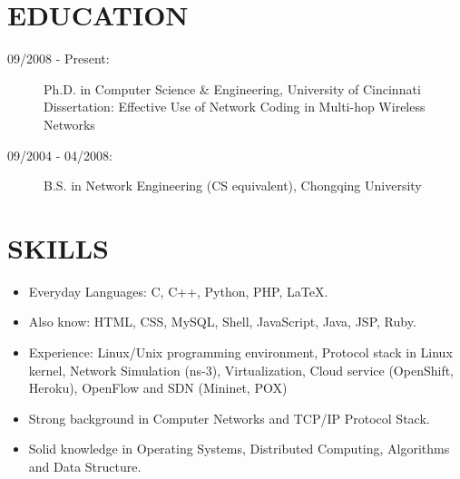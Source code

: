 \documentclass[line]{res}
\begin{document}
\address{226 Ludlow Ave Apt 11 \\ Cincinnati, OH 45220 \\ 513-679-0772}
\address{Email: \href{mailto:yang@yangchi.me}{yang@yangchi.me} \\ Github: \url{https://github.com/yangchi} }

\begin{resume}
	\section{EDUCATION}
	\begin{description}
		\item[09/2008 - Present:] Ph.D. in Computer Science \& Engineering, University of Cincinnati\\
			Dissertation: Effective Use of Network Coding in Multi-hop Wireless Networks
		\item[09/2004 - 04/2008:] B.S. in Network Engineering (CS equivalent), Chongqing University
	\end{description}
	
	\section{SKILLS}
	\begin{itemize}
		\item Everyday Languages: C, C++, Python, PHP, LaTeX.
		\item Also know: HTML, CSS, MySQL, Shell, JavaScript, Java, JSP, Ruby.
		\item Experience: Linux/Unix programming environment, Protocol stack in Linux kernel, Network Simulation (ns-3), Virtualization, Cloud service (OpenShift, Heroku), OpenFlow and SDN (Mininet, POX)
		\item Strong background in Computer Networks and TCP/IP Protocol Stack.
		\item Solid knowledge in Operating Systems, Distributed Computing, Algorithms and Data Structure.
	\end{itemize}


\end{resume}
\end{document}
